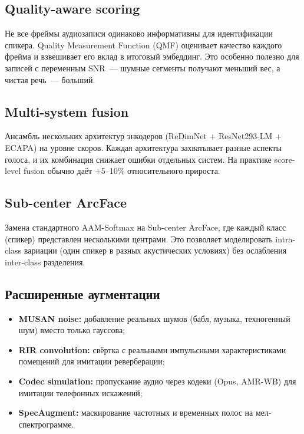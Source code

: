 \documentclass[12pt,a4paper]{article}
\begin{document}
\subsection{Quality-aware scoring}

Не все фреймы аудиозаписи одинаково информативны для идентификации спикера. Quality Measurement Function (QMF) оценивает качество каждого фрейма и взвешивает его вклад в итоговый эмбеддинг. Это особенно полезно для записей с переменным SNR~--- шумные сегменты получают меньший вес, а чистая речь~--- больший.

\subsection{Multi-system fusion}

Ансамбль нескольких архитектур энкодеров (ReDimNet + ResNet293-LM + ECAPA) на уровне скоров. Каждая архитектура захватывает разные аспекты голоса, и их комбинация снижает ошибки отдельных систем. На практике score-level fusion обычно даёт +5--10\% относительного прироста.

\subsection{Sub-center ArcFace}

Замена стандартного AAM-Softmax на Sub-center ArcFace, где каждый класс (спикер) представлен несколькими центрами. Это позволяет моделировать intra-class вариации (один спикер в разных акустических условиях) без ослабления inter-class разделения.

\subsection{Расширенные аугментации}

\begin{itemize}
  \item \textbf{MUSAN noise:} добавление реальных шумов (бабл, музыка, техногенный шум) вместо только гауссова;
  \item \textbf{RIR convolution:} свёртка с реальными импульсными характеристиками помещений для имитации реверберации;
  \item \textbf{Codec simulation:} пропускание аудио через кодеки (Opus, AMR-WB) для имитации телефонных искажений;
  \item \textbf{SpecAugment:} маскирование частотных и временных полос на мел-спектрограмме.
\end{itemize}
\end{document}
